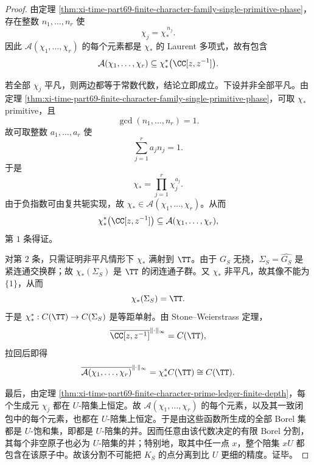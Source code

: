 \begin{proof}
由定理 \ref{thm:xi-time-part69-finite-character-family-single-primitive-phase}，存在整数 \(n_1,\dots,n_r\) 使
\[
\chi_j=\chi_\ast^{\,n_j}.
\]
因此 \(\mathcal A(\chi_1,\dots,\chi_r)\) 的每个元素都是 \(\chi_\ast\) 的 Laurent 多项式，故有包含
\[
\mathcal A(\chi_1,\dots,\chi_r)
\subseteq
\chi_\ast^{*}\bigl(\CC[z,z^{-1}]\bigr).
\]

若全部 \(\chi_j\) 平凡，则两边都等于常数代数，结论立即成立。下设并非全部平凡。由定理 \ref{thm:xi-time-part69-finite-character-family-single-primitive-phase}，可取 \(\chi_\ast\) primitive，且
\[
\gcd(n_1,\dots,n_r)=1.
\]
故可取整数 \(a_1,\dots,a_r\) 使
\[
\sum_{j=1}^{r}a_j n_j=1.
\]
于是
\[
\chi_\ast=\prod_{j=1}^{r}\chi_j^{a_j}.
\]
由于负指数可由复共轭实现，故 \(\chi_\ast\in \mathcal A(\chi_1,\dots,\chi_r)\)。从而
\[
\chi_\ast^{*}\bigl(\CC[z,z^{-1}]\bigr)
\subseteq
\mathcal A(\chi_1,\dots,\chi_r),
\]
第 \(1\) 条得证。

对第 \(2\) 条，只需证明非平凡情形下 \(\chi_\ast\) 满射到 \(\TT\)。由于 \(G_S\) 无挠，\(\Sigma_S=\widehat{G_S}\) 是紧连通交换群；故 \(\chi_\ast(\Sigma_S)\) 是 \(\TT\) 的闭连通子群。又 \(\chi_\ast\) 非平凡，故其像不能为 \(\{1\}\)，从而
\[
\chi_\ast(\Sigma_S)=\TT.
\]
于是 \(\chi_\ast^{*}:C(\TT)\to C(\Sigma_S)\) 是等距单射。由 Stone--Weierstrass 定理，
\[
\overline{\CC[z,z^{-1}]}^{\|\cdot\|_\infty}=C(\TT),
\]
拉回后即得
\[
\overline{\mathcal A(\chi_1,\dots,\chi_r)}^{\|\cdot\|_\infty}
=
\chi_\ast^{*}C(\TT)
\cong
C(\TT).
\]

最后，由定理 \ref{thm:xi-time-part69-finite-character-prime-ledger-finite-depth}，每个生成元 \(\chi_j\) 都在 \(U\)-陪集上恒定。故 \(\mathcal A(\chi_1,\dots,\chi_r)\) 的每个元素，以及其一致闭包中的每个元素，也都在 \(U\)-陪集上恒定。于是由这些函数所生成的全部 Borel 集都是 \(U\)-饱和集，即都是 \(U\)-陪集的并。因而任意由该代数决定的有限 Borel 分割，其每个非空原子也必为 \(U\)-陪集的并；特别地，取其中任一点 \(x\)，整个陪集 \(xU\) 都包含在该原子中。故该分割不可能把 \(K_S\) 的点分离到比 \(U\) 更细的精度。证毕。
\end{proof}

\endinput
